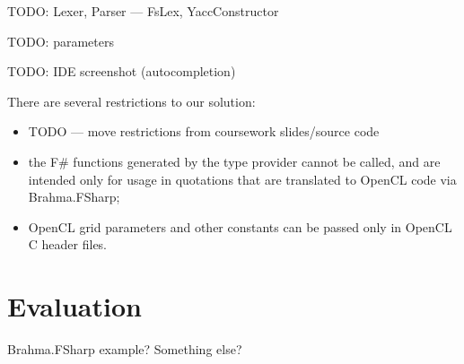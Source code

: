 \documentclass[sigplan,review]{acmart}\settopmatter{printfolios=true}
\begin{document}
TODO: Lexer, Parser --- FsLex, YaccConstructor

TODO: parameters

TODO: IDE screenshot (autocompletion)

There are several restrictions to our solution:
\begin{itemize}
    \item TODO --- move restrictions from coursework slides/source code
    \item the F\# functions generated by the type provider cannot be called, and are intended only for usage in quotations that are translated to OpenCL code via Brahma.FSharp;
    \item OpenCL grid parameters and other constants can be passed only in OpenCL C header files.
\end{itemize}

\section{Evaluation}

Brahma.FSharp example? Something else?










\end{document}
